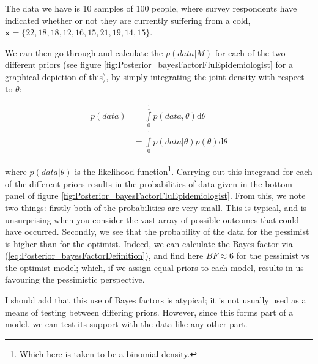 \documentclass[11pt,fullpage]{book}
\begin{document}
The data we have is 10 samples of 100 people, where survey respondents have indicated whether or not they are currently suffering from a cold, $\boldsymbol{x} = \{22, 18, 18, 12, 16, 15, 21, 19, 14, 15\}$. 

We can then go through and calculate the $p(data|M)$ for each of the two different priors (see figure \ref{fig:Posterior_bayesFactorFluEpidemiologist} for a graphical depiction of this), by simply integrating the joint density with respect to $\theta$:

\begin{equation}
\begin{align}
p(data) &= \int\limits_{0}^{1} p(data,\theta) \mathrm{d}\theta\\
&= \int\limits_{0}^{1} p(data|\theta) p(\theta) \mathrm{d}\theta
\end{align}
\end{equation}

where $p(data|\theta)$ is the likelihood function\footnote{Which here is taken to be a binomial density.}. Carrying out this integrand for each of the different priors results in the probabilities of data given in the bottom panel of figure \ref{fig:Posterior_bayesFactorFluEpidemiologist}. From this, we note two things: firstly both of the probabilities are very small. This is typical, and is unsurprising when you consider the vast array of possible outcomes that could have occurred. Secondly, we see that the probability of the data for the pessimist is higher than for the optimist. Indeed, we can calculate the Bayes factor via (\ref{eq:Posterior_bayesFactorDefinition}), and find here $BF \approx 6$ for the pessimist vs the optimist model; which, if we assign equal priors to each model, results in us favouring the pessimistic perspective.

I should add that this use of Bayes factors is atypical; it is not usually used as a means of testing between differing priors. However, since this forms part of a model, we can test its support with the data like any other part.
\end{document}

